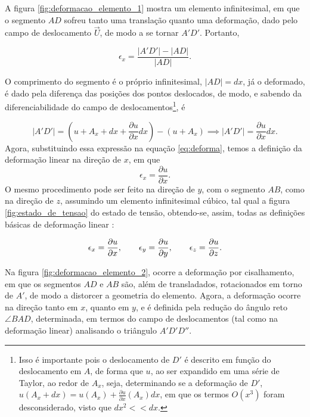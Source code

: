 A figura \ref{fig:deformacao_elemento_1} mostra um elemento infinitesimal, em que o segmento $AD$ sofreu tanto uma translação quanto uma deformação, dado pelo campo de deslocamento $\vec{U}$, de modo a se tornar $A'D'$. Portanto,

\begin{equation}
    \epsilon_x = \frac{|A'D'| - |AD|}{|AD|}.
    \label{eq:deforma}
\end{equation}



O comprimento do segmento é o próprio infinitesimal, $|AD| = dx$, já o deformado, é dado pela diferença das posições dos pontos deslocados, de modo, e sabendo da diferenciabilidade do campo de deslocamentos\footnote{Isso é importante pois o deslocamento de $D'$ é descrito em função do deslocamento em $A$, de forma que $u$, ao ser expandido em uma série de Taylor, ao redor de $A_x$, seja, determinando se a deformação de $D'$, $u(A_x + dx) = u(A_x) + \frac{\partial u}{\partial x}(A_x) dx$, em que os termos $O(x^3)$ foram desconsiderado, visto que $dx^2 << dx$.}, é

\begin{equation}
    |A'D'| = (u + A_x + dx + \frac{\partial u}{\partial x} dx) - (u + A_x) \implies |A'D'| = \frac{\partial u}{\partial x} dx.
\end{equation}
Agora, substituindo essa expressão na equação \ref{eq:deforma}, temos a definição da deformação linear na direção de $x$, em que
\begin{equation}
    \epsilon_x = \frac{\partial u}{\partial x}.
\end{equation}
O mesmo procedimento pode ser feito na direção de $y$, com o segmento $AB$, como na direção de $z$, assumindo um elemento infinitesimal cúbico, tal qual a figura \ref{fig:estado_de_tensao} do estado de tensão, obtendo-se, assim, todas as definições básicas de deformação linear \cite{popov}:

\begin{equation}
    \epsilon_x = \frac{\partial u}{\partial x}, \qquad \epsilon_y = \frac{\partial u}{\partial y}, \qquad \epsilon_z = \frac{\partial u}{\partial z}. \\
\end{equation}

Na figura \ref{fig:deformacao_elemento_2}, ocorre a deformação por cisalhamento, em que os segmentos $AD$ e $AB$ são, além de transladados, rotacionados em torno de $A'$, de modo a distorcer a geometria do elemento. Agora, a deformação ocorre na direção tanto em $x$, quanto em $y$, e é definida pela redução do ângulo reto $\angle BAD$, determinada, em termos do campo de deslocamentos (tal como na deformação linear) analisando o triângulo $A'D'D''$.

